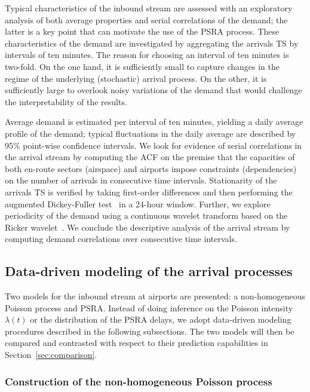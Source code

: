 \documentclass[draft,review]{elsarticle}
\begin{document}
Typical characteristics of the inbound stream are assessed with an ex\-plorato\-ry analysis of both average properties and serial correlations of the demand; the latter is a key point that can motivate the use of the \ac{PSRA} process.
These characteristics of the demand are investigated by aggregating the arrivals \ac{TS} by intervals of ten minutes.
The reason for choosing an interval of ten minutes is two-fold.
On the one hand, it is sufficiently small to capture changes in the regime of the underlying (stochastic) arrival process.
On the other, it is sufficiently large to overlook noisy variations of the demand that would challenge the interpretability of the results.

Average demand is estimated per interval of ten minutes, yielding a daily average profile of the demand; typical fluctuations in the daily average are described by 95\% point-wise confidence intervals.
We look for evidence of serial correlations in the arrival stream by computing the \ac{ACF} on the premise that the capacities of both en-route sectors (airspace) and airports impose constraints (dependencies) on the number of arrivals in consecutive time intervals.
Stationarity of the arrivals \acs{TS} is verified by taking first-order differences and then performing the augmented Dickey-Fuller test~\citep{fuller2009introduction,seabold2010statsmodels} in a 24-hour window.
Further, we explore periodicity of the demand using a continuous wavelet transform based on the Ricker wavelet~\citep{ricker}.
We conclude the descriptive analysis of the arrival stream by computing demand correlations over consecutive time intervals.

\subsection{Data-driven modeling of the arrival processes}\label{sec:dm_modeling}

Two models for the inbound stream at airports are presented: a non-ho\-mo\-ge\-neous Poisson process and \ac{PSRA}.
Instead of doing inference on the Poisson intensity \(\lambda(t)\) or the distribution of the \ac{PSRA} delays, we adopt data-driven modeling procedures described in the following subsections.
The two models will then be compared and contrasted with respect to their prediction capabilities in Section~\ref{sec:comparison}.

\subsubsection{Construction of the non-homogeneous Poisson process}\label{sec:dm_pois}
\end{document}
